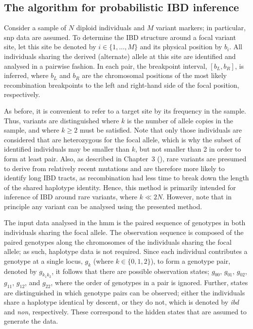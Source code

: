 %
\subsection{The algorithm for probabilistic IBD inference}
%


Consider a sample of $N$ diploid individuals and $M$ variant markers; in particular, \gls{snp} data are assumed.
To determine the IBD structure around a focal variant site, let this site be denoted by ${i \in \lbrace 1, \ldots, M \rbrace}$ and its physical position by $b_i$.
All individuals sharing the derived (alternate) allele at this site are identified and analysed in a pairwise fashion.
In each pair, the breakpoint interval, ${[b_L, b_R]}$, is inferred, where $b_L$ and $b_R$ are the chromosomal positions of the most likely recombination breakpoints to the left and right-hand side of the focal position, respectively.

As before, it is convenient to refer to a target site by its frequency in the sample.
Thus, \fk{} variants are distinguished where $k$ is the number of allele copies in the sample, and where ${k \geq 2}$ must be satisfied.
Note that only those individuals are considered that are heterozygous for the focal allele, which is why the subset of identified individuals may be smaller than $k$, but not smaller than 2 in order to form at least  pair.
Also, as described in Chapter~3 (), rare variants are presumed to derive from relatively recent mutations and are therefore more likely to identify long IBD tracts, as recombination had less time to break down the length of the shared haplotype identity.
Hence, this method is primarily intended for inference of IBD around rare variants, where ${k \ll 2N}$.
However, note that in principle any  variant can be analysed using the presented method.

The input data analysed in the \gls{hmm} is the paired sequence of genotypes in both individuals sharing the focal allele.
The observation sequence is composed of the paired genotypes along the chromosomes of the  individuals sharing the focal allele; as such, haplotype data is not required.
Since each individual contributes a genotype at a single locus, $g_k$ (where ${k \in \lbrace 0,1,2 \rbrace}$), to form a genotype pair, denoted by $g_{k_1 k_2}$, it follows that there are  possible observation states; $g_{00}$, $g_{01}$, $g_{02}$, $g_{11}$, $g_{12}$, and $g_{22}$, where the order of genotypes in a pair is ignored.
Further,  states are distinguished in which genotype pairs can be observed; either the  individuals share a haplotype identical by descent, or they do not, which is denoted by \emph{ibd} and \emph{non}, respectively.
These correspond to the hidden states that are assumed to generate the data.


